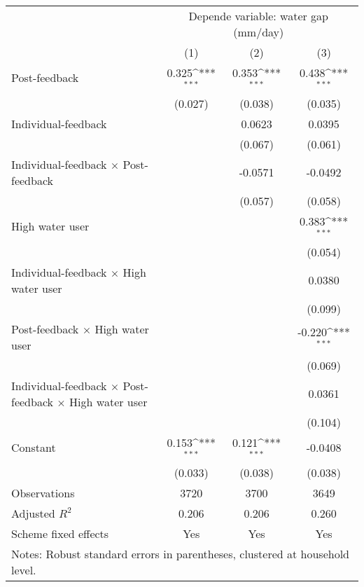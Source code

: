 {
\def\sym#1{\ifmmode^{#1}\else\(^{#1}\)\fi}
\begin{tabular}{l*{3}{c}}
\hline\hline
                    &\multicolumn{3}{c}{Depende variable: water gap (mm/day)}         \\\cmidrule(lr){2-4}
                    &\multicolumn{1}{c}{(1)}         &\multicolumn{1}{c}{(2)}         &\multicolumn{1}{c}{(3)}         \\
\hline
Post-feedback       &       0.325\sym{***}&       0.353\sym{***}&       0.438\sym{***}\\
                    &     (0.027)         &     (0.038)         &     (0.035)         \\
[1em]
Individual-feedback &                     &      0.0623         &      0.0395         \\
                    &                     &     (0.067)         &     (0.061)         \\
[1em]
Individual-feedback $\times$ Post-feedback&                     &     -0.0571         &     -0.0492         \\
                    &                     &     (0.057)         &     (0.058)         \\
[1em]
High water user     &                     &                     &       0.383\sym{***}\\
                    &                     &                     &     (0.054)         \\
[1em]
Individual-feedback $\times$ High water user&                     &                     &      0.0380         \\
                    &                     &                     &     (0.099)         \\
[1em]
Post-feedback $\times$ High water user&                     &                     &      -0.220\sym{***}\\
                    &                     &                     &     (0.069)         \\
[1em]
Individual-feedback $\times$ Post-feedback $\times$ High water user&                     &                     &      0.0361         \\
                    &                     &                     &     (0.104)         \\
[1em]
Constant            &       0.153\sym{***}&       0.121\sym{***}&     -0.0408         \\
                    &     (0.033)         &     (0.038)         &     (0.038)         \\
\hline
Observations        &        3720         &        3700         &        3649         \\
Adjusted \(R^{2}\)  &       0.206         &       0.206         &       0.260         \\
Scheme fixed effects&         Yes         &         Yes         &         Yes         \\
\hline\hline
\multicolumn{4}{l}{\footnotesize Notes: Robust standard errors in parentheses, clustered at household level.}\\
\end{tabular}
}
